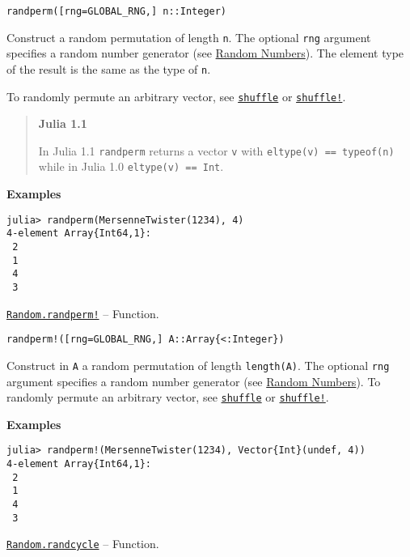 \begin{adjustwidth}{2em}{0pt}


\begin{verbatim}
randperm([rng=GLOBAL_RNG,] n::Integer)
\end{verbatim}

Construct a random permutation of length \texttt{n}. The optional \texttt{rng} argument specifies a random number generator (see \hyperlink{16621464973028186601}{Random Numbers}). The element type of the result is the same as the type of \texttt{n}.

To randomly permute an arbitrary vector, see \hyperlink{16742615893822221762}{\texttt{shuffle}} or \hyperlink{15315300334019616632}{\texttt{shuffle!}}.

\begin{quote}
\textbf{Julia 1.1}

In Julia 1.1 \texttt{randperm} returns a vector \texttt{v} with \texttt{eltype(v) == typeof(n)} while in Julia 1.0 \texttt{eltype(v) == Int}.

\end{quote}
\textbf{Examples}


\begin{verbatim}
julia> randperm(MersenneTwister(1234), 4)
4-element Array{Int64,1}:
 2
 1
 4
 3
\end{verbatim}



\end{adjustwidth}
\hypertarget{9956290992837499502}{} 
\hyperlink{9956290992837499502}{\texttt{Random.randperm!}}  -- {Function.}

\begin{adjustwidth}{2em}{0pt}


\begin{verbatim}
randperm!([rng=GLOBAL_RNG,] A::Array{<:Integer})
\end{verbatim}

Construct in \texttt{A} a random permutation of length \texttt{length(A)}. The optional \texttt{rng} argument specifies a random number generator (see \hyperlink{16621464973028186601}{Random Numbers}). To randomly permute an arbitrary vector, see \hyperlink{16742615893822221762}{\texttt{shuffle}} or \hyperlink{15315300334019616632}{\texttt{shuffle!}}.

\textbf{Examples}


\begin{verbatim}
julia> randperm!(MersenneTwister(1234), Vector{Int}(undef, 4))
4-element Array{Int64,1}:
 2
 1
 4
 3
\end{verbatim}



\end{adjustwidth}
\hypertarget{8716855906711617057}{} 
\hyperlink{8716855906711617057}{\texttt{Random.randcycle}}  -- {Function.}

